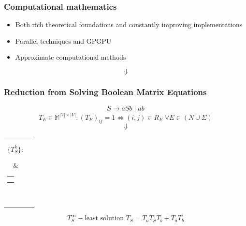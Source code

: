 \documentclass[aspectratio=169,xcolor=table]{beamer}
\begin{document}
\begin{frame}[fragile]
   
  \frametitle{Computational mathematics}
\begin{itemize}
  \item Both rich theoretical foundations and constantly improving implementations
  \item Parallel techniques and GPGPU
  \item Approximate computational methods
\end{itemize}
\pause
    \vspace{5pt}
    \color{red} {$$\Downarrow$$}
    \large\centering\color{red}{Acceleration of CFPQs processing}
   
\end{frame}


\begin{frame}[fragile]
   
  \frametitle{Reduction from Solving Boolean Matrix Equations}
  
  $$S \rightarrow aSb \mid ab$$
  $$T_E \in \mathbb{M}^{|V| \times |V|}: (T_{E})_{ij} = 1 \iff (i,j) \in R_E \; \forall E \in (N \cup \Sigma)$$
  \pause
  $$\Downarrow$$
    \centering
    \begin{tabular}{cl}
    \parbox{0.07\linewidth}{
    $$\{ T_S^k \}:$$
    }
    & \begin{tabular}{l}
    $T_S^0 = \mathbf{0}$ \\
    $T_S^{k+1} = T_a T_S^k T_b + T_a T_b$
    \end{tabular} \\
    \end{tabular}

  $$T_S^{\infty} - \text{least solution } T_S = T_aT_ST_b + T_aT_b$$

\end{frame}
\end{document}

